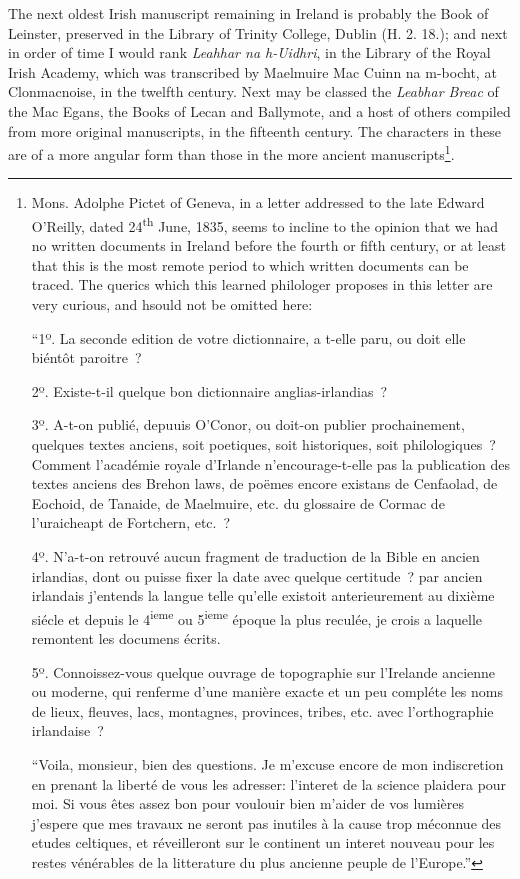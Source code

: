 \documentclass[11pt,oneside]{memoir}
\begin{document}
The next oldest Irish manuscript remaining in Ireland is probably the Book of Leinster, preserved in the Library of Trinity College, Dublin (H. 2. 18.);
and next in order of time I would rank \textit{Leahhar na h-Uidhri}, in the Library of the 
Royal Irish Academy, which was transcribed by Maelmuire Mac Cuinn na m-bocht, at Clonmacnoise, in the twelfth century.
Next may be classed the \textit{Leabhar Breac} of the Mac Egans, the Books of Lecan and Ballymote, and a host of others compiled from more original manuscripts, in the fifteenth century.
The characters in these are of a more angular form than those in the more ancient manuscripts\footnote{
    Mons. Adolphe Pictet of Geneva, in a letter addressed to the late Edward O'Reilly, dated 24\textsuperscript{th} June, 1835, seems to incline to the opinion that we had no written documents in Ireland before the fourth or fifth century, or at least that this is the most remote period to which written documents can be traced.
    The querics which this learned philologer proposes in this letter are very curious, and hsould not be omitted here:

        ``1º. La seconde edition de votre dictionnaire, a t-elle paru, ou doit elle biéntôt paroitre~?

        2º. Existe-t-il quelque bon dictionnaire anglias-irlandias~?

        3º. A-t-on publié, depuuis O'Conor, ou doit-on publier prochainement, quelques textes anciens, soit poetiques, soit historiques, soit philologiques~?
        Comment l'académie royale d'Irlande n'encourage-t-elle pas la publication des textes anciens des Brehon laws, de poëmes encore existans de Cenfaolad, de Eochoid, de Tanaide, de Maelmuire, etc. du glossaire de Cormac de l'uraicheapt de Fortchern, etc.~?

        4º. N'a-t-on retrouvé aucun fragment de traduction de la Bible en ancien irlandias, dont ou puisse fixer la date avec quelque certitude~?
        par ancien irlandais j'entends la langue telle qu'elle existoit anterieurement au dixième siécle et depuis le 4\textsuperscript{ieme} ou 5\textsuperscript{ieme} époque la plus reculée, je crois a laquelle remontent les documens écrits.

        5º. Connoissez-vous quelque ouvrage de topographie sur l'Irelande ancienne ou moderne, qui renferme d'une manière exacte et un peu compléte les noms de lieux, fleuves, lacs, montagnes, provinces, tribes, etc. avec l'orthographie irlandaise~?

        ``Voila, monsieur, bien des questions.
        Je m'excuse encore de mon indiscretion en prenant la liberté de vous les adresser:
        l'interet de la science plaidera pour moi.
        Si vous êtes assez bon pour voulouir bien m'aider de vos lumières j'espere que mes travaux ne seront pas inutiles à la cause trop méconnue des etudes celtiques, et réveilleront sur le continent un interet nouveau pour les restes vénérables de la litterature du plus ancienne peuple de l'Europe.''
}.
\end{document}
